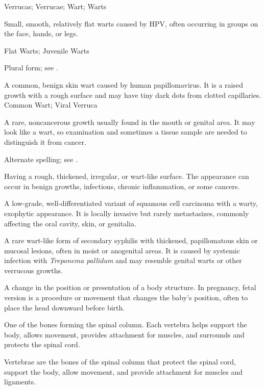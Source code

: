 \synonyms
Verrucas; Verrucae; Wart; Warts

 Small, smooth, relatively flat warts caused by HPV, often occurring in groups on the face, hands, or legs.

\synonyms
Flat Warts; Juvenile Warts

 Plural form; see .

 A common, benign skin wart caused by human papillomavirus. It is a raised growth with a rough surface and may have tiny dark dots from clotted capillaries.
\synonyms
Common Wart; Viral Verruca

 A rare, noncancerous growth usually found in the mouth or genital area. It may look like a wart, so examination and sometimes a tissue sample are needed to distinguish it from cancer.

 Alternate spelling; see .

 Having a rough, thickened, irregular, or wart-like surface. The appearance can occur in benign growths, infections, chronic inflammation, or some cancers.

 A low-grade, well-differentiated variant of squamous cell carcinoma with a warty,
exophytic appearance. It is locally invasive but rarely metastasizes, commonly affecting
the oral cavity, skin, or genitalia.

 A rare wart-like form of secondary syphilis with thickened, papillomatous skin or mucosal lesions, often in moist or anogenital areas. It is caused by systemic infection with \textit{Treponema pallidum} and may resemble genital warts or other verrucous growths.

 A change in the position or presentation of a body structure. In pregnancy, fetal version is a procedure or movement that changes the baby’s position, often to place the head downward before birth.

 One of the bones forming the spinal column. Each vertebra helps support the body, allows movement, provides attachment for muscles, and surrounds and protects the spinal cord.

 Vertebrae are the bones of the spinal column that protect the spinal cord, support the body, allow movement, and provide attachment for muscles and ligaments.

